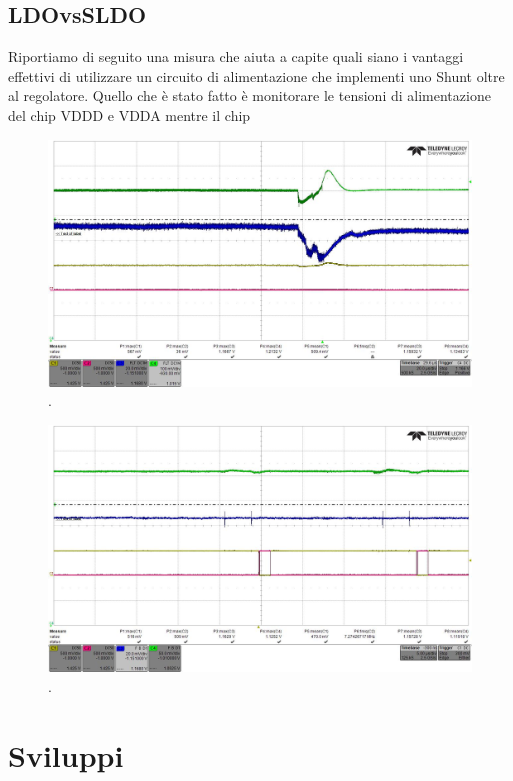 \subsection{LDOvsSLDO}
Riportiamo di seguito una misura che aiuta a capite quali siano i vantaggi effettivi di utilizzare un circuito di alimentazione che implementi uno Shunt oltre al regolatore. Quello che è stato fatto è monitorare le tensioni di alimentazione del chip VDDD e VDDA mentre il chip 
\begin{figure}
\centering
\includegraphics[scale=.3]{Immagini/alllin1}
\caption{.}
\label{alllin1}
\end{figure}


\begin{figure}
\centering
\includegraphics[scale=.3]{Immagini/alllin2}
\caption{.}
\label{alllin2}
\end{figure}
\section{Sviluppi}